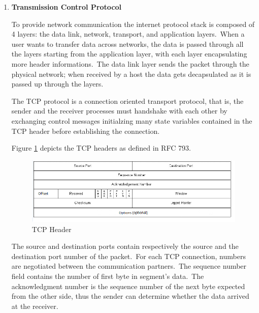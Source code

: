 					\begin{enumerate}
						\item{\textbf{Transmission Control Protocol}}
						
							To provide network communication the internet protocol stack is composed of 4 layers: the data link, network, transport, and application layers.\ When a user wants to transfer data across networks, the data is passed through all the layers starting from the application layer, with each layer encapsulating  more header informations.\ The data link layer sends the packet through the physical network; when received by a host the data gets decapsulated as it is passed up  through the layers.

							The TCP protocol is a connection oriented transport protocol, that is, the sender and the receiver processes must handshake with each other by exchanging control messages initialzing many state variables contained in the TCP header before establishing the connection.

							Figure \ref{tcp} depicts the TCP headers as defined in RFC 793.
								\begin{figure}[h!]
									\centering
									\includegraphics[scale=0.66]{figures/TCP.png} 
									\caption{TCP Header}\label{tcp} 	
								\end{figure}

							The source and destination ports contain respectively the source and the destination port number of the packet.\ For each TCP connection, numbers are negotiated between the communication partners.\ The sequence number field contains the number of first byte in segment's data.\ The acknowledgment number is the sequence number of the next byte expected from the other side, thus the sender can determine whether the data arrived at the receiver.
							

\end{enumerate}
